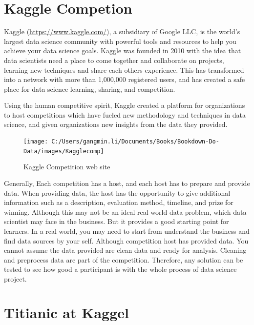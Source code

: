 \documentclass[
]{book}
\renewenvironment{quote}{\begin{VF}}{\end{VF}}
\begin{document}
\begin{quote}
\end{quote}

\hypertarget{kaggle-competion}{%
\section{Kaggle Competion}\label{kaggle-competion}}

Kaggle (\url{https://www.kaggle.com/}), a subsidiary of Google LLC, is the world's largest data science community with powerful tools and resources to help you achieve your data science goals. Kaggle was founded in 2010 with the idea that data scientists need a place to come together and collaborate on projects, learning new techniques and share each others experience. This has transformed into a network with more than 1,000,000 registered users, and has created a safe place for data science learning, sharing, and competition.

Using the human competitive spirit, Kaggle created a platform for organizations to host competitions which have fueled new methodology and techniques in data science, and given organizations new insights from the data they provided.

\begin{figure}

{\centering \texttt{[image: C:/Users/gangmin.li/Documents/Books/Bookdown-Do-Data/images/Kagglecomp]} 

}

\caption{Kaggle Competition web site}\label{fig:unnamed-chunk-10}
\end{figure}

Generally, Each competition has a host, and each host has to prepare and provide data. When providing data, the host has the opportunity to give additional information such as a description, evaluation method, timeline, and prize for winning. Although this may not be an ideal real world data problem, which data scientist may face in the business. But it provides a good starting point for learners. In a real world, you may need to start from understand the business and find data sources by your self. Although competition host has provided data. You cannot assume the data provided are clean data and ready for analysis. Cleaning and preprocess data are part of the competition. Therefore, any solution can be tested to see how good a participant is with the whole process of data science project.

\hypertarget{titianic-at-kaggel}{%
\section{Titianic at Kaggel}\label{titianic-at-kaggel}}
\end{document}
